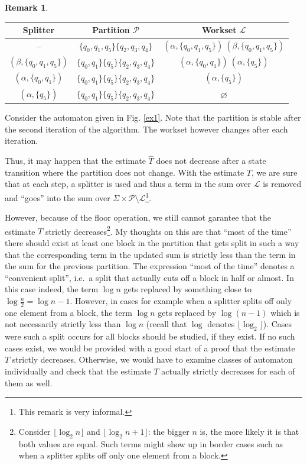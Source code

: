 \documentclass[12pt, a4 paper]{article}
\theoremstyle{definition}
\newtheorem{remark}{Remark}
\begin{document}
\begin{remark}
    \begin{table}[!ht]
        \centering
        \small
        \begin{tabular}{c|c|c}
            Splitter & Partition $\mathcal{P}$ & Workset $\mathcal{L}$\\
            \hline
            -- & $\{q_0,q_1, q_5\}\{q_2, q_3, q_4\}$ & $(\alpha, \{q_0,q_1, q_5\})\ (\beta, \{q_0,q_1, q_5\})$\\
            $(\beta, \{q_0,q_1, q_5\})$ & $\{q_0,q_1\}\{q_5\}\{q_2, q_3, q_4\}$ & $(\alpha, \{q_0,q_1\})\ (\alpha, \{q_5\})$\\
            $(\alpha, \{q_0,q_1\})$ & $\{q_0,q_1\}\{q_5\}\{q_2, q_3, q_4\}$ & $(\alpha, \{q_5\})$\\
            $(\alpha, \{q_5\})$ & $\{q_0,q_1\}\{q_5\}\{q_2, q_3, q_4\}$ & $\varnothing$\\
        \end{tabular}
    \end{table}
    Consider the automaton given in Fig. \ref{ex1}.
    Note that the partition is stable after the second iteration of the algorithm. The workset however changes after each iteration.
\end{remark}

Thus, it may happen that the estimate $\hat{T}$ does not decrease after a state transition where the partition does not change.
With the estimate $T$, we are sure that at each step, a splitter is used and thus a term in the sum over $\mathcal{L}$ is removed and ``goes'' into the sum over $\Sigma \times \mathcal{P} \setminus \mathcal{L}$\footnote{This remark is very informal.}.

However, because of the floor operation, we still cannot garantee that the estimate $T$ strictly decreases\footnote{Consider $\lfloor \log_2 n \rfloor$ and $\lfloor \log_2 n+1 \rfloor$: the bigger $n$ is, the more likely it is that both values are equal. Such terms might show up in border cases such as when a splitter splits off only one element from a block.}.
My thoughts on this are that ``most of the time'' there should exist at least one block in the partition that gets split in such a way that the corresponding term in the updated sum is strictly less than the term in the sum for the previous partition. The expression ``most of the time'' denotes a ``convenient split'', i.e.\ a split that actually cuts off a block in half or almost. In this case indeed, the term $\log n$ gets replaced by something close to $\log \frac{n}{2} = \log n - 1$.
However, in cases for example when a splitter splits off only one element from a block, the term $\log n$ gets replaced by $\log (n-1)$ which is not necessarily strictly less than $\log n$ (recall that $\log$ denotes $\lfloor \log_2 \rfloor$). Cases were such a split occurs for all blocks should be studied, if they exist. If no such cases exist, we would be provided with a good start of a proof that the estimate $T$ strictly decreases. Otherwise, we would have to examine classes of automaton individually and check that the estimate $T$ actually strictly decreases for each of them as well.
\end{document}
